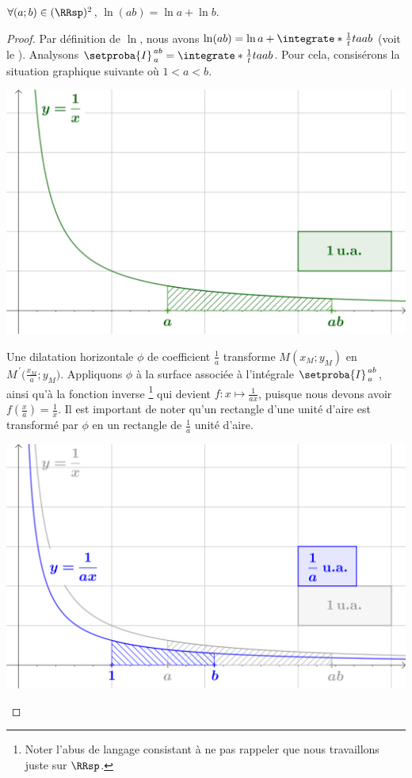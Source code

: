 \begin{fact}
	$\forall (a;b) \in ( \RRsp )^2$,
	$\ln(a b) = \ln a + \ln b$.
\end{fact}


\begin{proof}
	Par définition de $\ln$, nous avons 
	$\ln(a b) = \ln a + \integrate*{\frac1t}{t}{a}{ab}$
	(voit le ).
	Analysons $\setproba{I}_{\,a}^{\,ab} = \integrate*{\frac1t}{t}{a}{ab}$.
	Pour cela, consisérons la situation graphique suivante où $1 < a < b$.
	
	\begin{center}
		\includegraphics[scale=.5]{content/ln/func-eq-1.png}
	\end{center}

	Une dilatation horizontale $\phi$ de coefficient $\frac1a$ transforme $M(x_M ; y_M)$ en $M^{\,\prime}\big( \frac{x_M}{a} ; y_M)$. 
	Appliquons $\phi$ à la surface associée à l'intégrale $\setproba{I}_{\,a}^{\,ab}$, ainsi qu'à la fonction inverse%
	\footnote{
		Noter l'abus de langage consistant à ne pas rappeler que nous travaillons juste sur $\RRsp$.
	}
	qui devient $f: x \mapsto \frac{1}{a x}$, puisque nous devons avoir $f(\frac{x}{a}) = \frac{1}{x}$. 
	Il est important de noter qu'un rectangle d'une unité d'aire est transformé par $\phi$ en un rectangle de $\frac1a$ unité d'aire.

	\begin{center}
		\includegraphics[scale=.5]{content/ln/func-eq-2.png}
	\end{center}


\end{proof}
